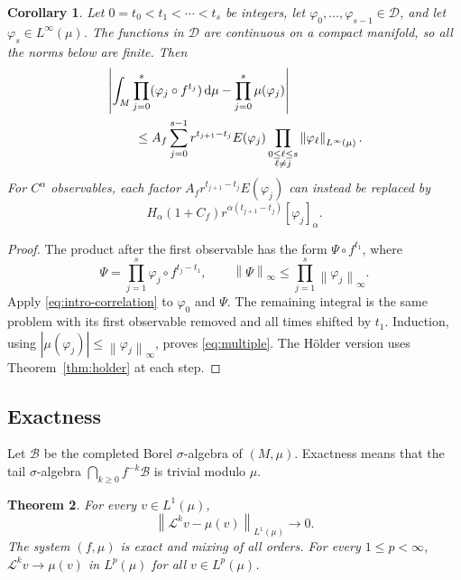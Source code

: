 \documentclass[11pt,reqno]{amsart}
\theoremstyle{plain}
\newtheorem{theorem}{Theorem}[section]
\newtheorem{corollary}[theorem]{Corollary}
\theoremstyle{definition}
\theoremstyle{remark}
\newcommand{\Lop}{\mathcal L}
\newcommand{\Bcal}{\mathcal B}
\newcommand{\Dcal}{\mathcal D}
\newcommand{\norm}[1]{\left\lVert #1\right\rVert}
\newcommand{\abs}[1]{\left\lvert #1\right\rvert}
\newcommand{\dd}{\mathrm d}
\numberwithin{equation}{section}
\begin{document}
\begin{corollary}\label{cor:multiple}
Let $0=t_0<t_1<\cdots<t_s$ be integers, let $\varphi_0,\ldots,\varphi_{s-1}\in\Dcal$, and let $\varphi_s\in L^\infty(\mu)$. The functions in $\Dcal$ are continuous on a compact manifold, so all the norms below are finite. Then
\begin{align}
 &\abs{\int_M\prod_{j=0}^s(\varphi_j\circ f^{t_j})\,\dd\mu
                  -\prod_{j=0}^s\mu(\varphi_j)}\notag\\
 &\hspace{8mm}\le A_f\sum_{j=0}^{s-1}
 r^{t_{j+1}-t_j}E(\varphi_j)
 \prod_{\substack{0\le\ell\le s\\\ell\ne j}}
 \norm{\varphi_\ell}_{L^\infty(\mu)}.\label{eq:multiple}
\end{align}
For $C^\alpha$ observables, each factor $A_fr^{t_{j+1}-t_j}E(\varphi_j)$ can instead be replaced by
\[
 H_\alpha(1+C_f)r^{\alpha(t_{j+1}-t_j)}[\varphi_j]_\alpha.
\]
\end{corollary}

\begin{proof}
The product after the first observable has the form $\Psi\circ f^{t_1}$, where
\[
 \Psi=\prod_{j=1}^s\varphi_j\circ f^{t_j-t_1},
 \qquad\norm{\Psi}_\infty\le\prod_{j=1}^s\norm{\varphi_j}_\infty.
\]
Apply \eqref{eq:intro-correlation} to $\varphi_0$ and $\Psi$. The remaining integral is the same problem with its first observable removed and all times shifted by $t_1$. Induction, using $|\mu(\varphi_j)|\le\norm{\varphi_j}_\infty$, proves \eqref{eq:multiple}. The H\"older version uses Theorem~\ref{thm:holder} at each step.
\end{proof}

\subsection{Exactness}

Let $\Bcal$ be the completed Borel $\sigma$-algebra of $(M,\mu)$. Exactness means that the tail $\sigma$-algebra $\bigcap_{k\ge0}f^{-k}\Bcal$ is trivial modulo $\mu$.

\begin{theorem}\label{thm:exactness}
For every $v\in L^1(\mu)$,
\begin{equation}\label{eq:L1-exact}
 \norm{\Lop^kv-\mu(v)}_{L^1(\mu)}\longrightarrow0.
\end{equation}
The system $(f,\mu)$ is exact and mixing of all orders. For every $1\le p<\infty$, $\Lop^kv\to\mu(v)$ in $L^p(\mu)$ for all $v\in L^p(\mu)$.
\end{theorem}
\end{document}
